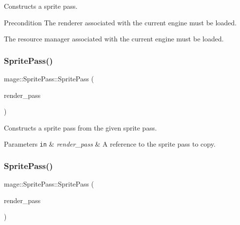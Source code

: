 Constructs a sprite pass.

\begin{DoxyPrecond}{Precondition}
The renderer associated with the current engine must be loaded. 

The resource manager associated with the current engine must be loaded. 
\end{DoxyPrecond}
\hypertarget{classmage_1_1_sprite_pass_ac24c782ce252cbbe179aab2277507a87}{}\label{classmage_1_1_sprite_pass_ac24c782ce252cbbe179aab2277507a87} 
\subsubsection{\texorpdfstring{Sprite\+Pass()}{SpritePass()}\hspace{0.1cm}{\footnotesize\ttfamily [2/3]}}
{\footnotesize\ttfamily mage\+::\+Sprite\+Pass\+::\+Sprite\+Pass (\begin{DoxyParamCaption}\item[{const \hyperlink{classmage_1_1_sprite_pass}{Sprite\+Pass} \&}]{render\+\_\+pass }\end{DoxyParamCaption})\hspace{0.3cm}{\ttfamily [delete]}}

Constructs a sprite pass from the given sprite pass.


\begin{DoxyParams}[1]{Parameters}
\mbox{\tt in}  & {\em render\+\_\+pass} & A reference to the sprite pass to copy. \\
\hline
\end{DoxyParams}
\hypertarget{classmage_1_1_sprite_pass_a2af9ccc7970eeff94293638d0cd26d16}{}\label{classmage_1_1_sprite_pass_a2af9ccc7970eeff94293638d0cd26d16} 
\subsubsection{\texorpdfstring{Sprite\+Pass()}{SpritePass()}\hspace{0.1cm}{\footnotesize\ttfamily [3/3]}}
{\footnotesize\ttfamily mage\+::\+Sprite\+Pass\+::\+Sprite\+Pass (\begin{DoxyParamCaption}\item[{\hyperlink{classmage_1_1_sprite_pass}{Sprite\+Pass} \&\&}]{render\+\_\+pass }\end{DoxyParamCaption})\hspace{0.3cm}{\ttfamily [default]}}

